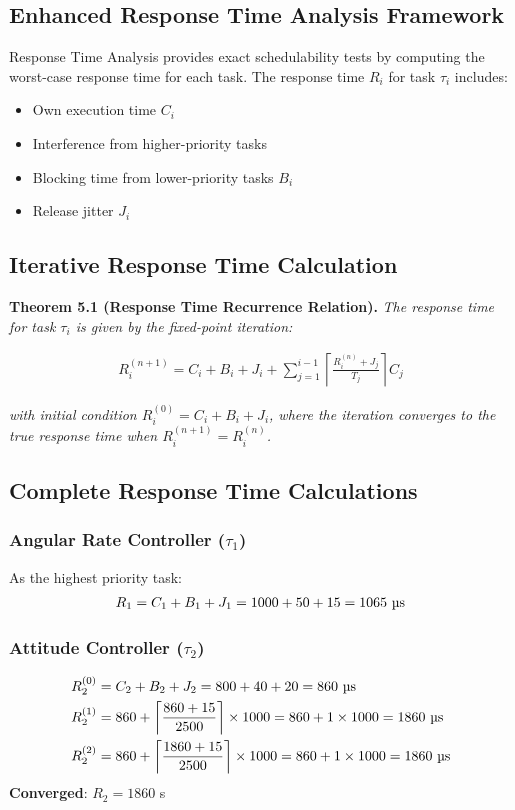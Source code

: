 \documentclass[11pt]{article}
\begin{document}
\subsection{Enhanced Response Time Analysis Framework}

Response Time Analysis provides exact schedulability tests by computing the worst-case response time for each task. The response time $R_i$ for task $\tau_i$ includes:

\begin{itemize}
    \item Own execution time $C_i$
    \item Interference from higher-priority tasks
    \item Blocking time from lower-priority tasks $B_i$
    \item Release jitter $J_i$
\end{itemize}

\subsection{Iterative Response Time Calculation}

\textbf{Theorem 5.1 (Response Time Recurrence Relation).} \textit{The response time for task $\tau_i$ is given by the fixed-point iteration:}

\begin{align}
R_i^{(n+1)} = C_i + B_i + J_i + \sum_{j=1}^{i-1} \left\lceil \frac{R_i^{(n)} + J_j}{T_j} \right\rceil C_j
\end{align}

\textit{with initial condition $R_i^{(0)} = C_i + B_i + J_i$, where the iteration converges to the true response time when $R_i^{(n+1)} = R_i^{(n)}$.}

\subsection{Complete Response Time Calculations}

\subsubsection{Angular Rate Controller ($\tau_1$)}
As the highest priority task:
\begin{align}
R_1 = C_1 + B_1 + J_1 = 1000 + 50 + 15 = 1065 \text{ \textmu s}
\end{align}

\subsubsection{Attitude Controller ($\tau_2$)}
\begin{align}
R_2^{(0)} &= C_2 + B_2 + J_2 = 800 + 40 + 20 = 860 \text{ \textmu s}\\
R_2^{(1)} &= 860 + \left\lceil \frac{860 + 15}{2500} \right\rceil \times 1000 = 860 + 1 \times 1000 = 1860 \text{ \textmu s}\\
R_2^{(2)} &= 860 + \left\lceil \frac{1860 + 15}{2500} \right\rceil \times 1000 = 860 + 1 \times 1000 = 1860 \text{ \textmu s}
\end{align}
\textbf{Converged}: $R_2 = 1860$ \textmu s
\end{document}

